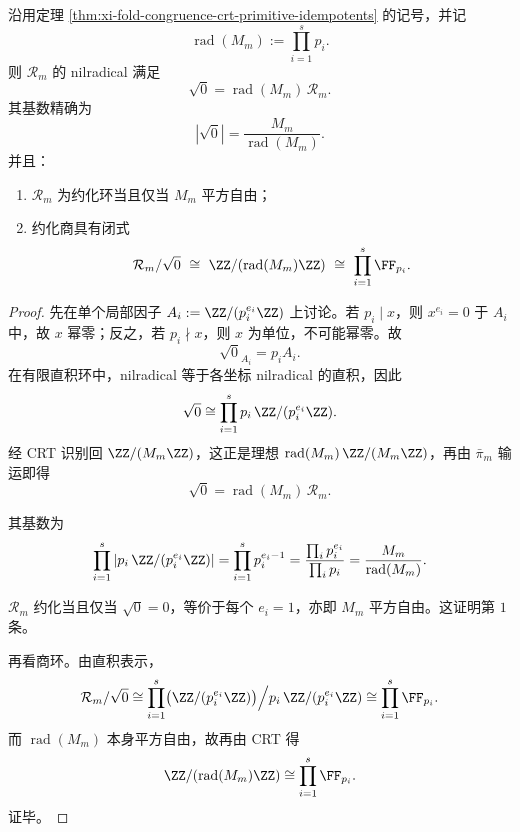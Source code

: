 \begin{theorem}\label{thm:xi-fold-congruence-nilradical-reduced-quotient}
沿用定理 \ref{thm:xi-fold-congruence-crt-primitive-idempotents} 的记号，并记
\[
\operatorname{rad}(M_m):=\prod_{i=1}^{s}p_i.
\]
则 \(\mathcal R_m\) 的 nilradical 满足
\[
\sqrt{0}=\operatorname{rad}(M_m)\,\mathcal R_m.
\]
其基数精确为
\[
|\sqrt{0}|=\frac{M_m}{\operatorname{rad}(M_m)}.
\]
并且：
\begin{enumerate}
  \item \(\mathcal R_m\) 为约化环当且仅当 \(M_m\) 平方自由；
  \item 约化商具有闭式
  \[
  \mathcal R_m/\sqrt{0}
  \ \cong\
  \ZZ/(\operatorname{rad}(M_m)\ZZ)
  \ \cong\
  \prod_{i=1}^{s}\FF_{p_i}.
  \]
\end{enumerate}
\end{theorem}
\begin{proof}
先在单个局部因子 \(A_i:=\ZZ/(p_i^{e_i}\ZZ)\) 上讨论。若 \(p_i\mid x\)，则 \(x^{e_i}=0\) 于 \(A_i\) 中，故 \(x\) 幂零；反之，若 \(p_i\nmid x\)，则 \(x\) 为单位，不可能幂零。故
\[
\sqrt{0}_{A_i}=p_iA_i.
\]
在有限直积环中，nilradical 等于各坐标 nilradical 的直积，因此
\[
\sqrt{0}\cong \prod_{i=1}^{s}p_i\,\ZZ/(p_i^{e_i}\ZZ).
\]
经 CRT 识别回 \(\ZZ/(M_m\ZZ)\)，这正是理想 \(\operatorname{rad}(M_m)\,\ZZ/(M_m\ZZ)\)，再由 \(\bar\pi_m\) 输运即得
\[
\sqrt{0}=\operatorname{rad}(M_m)\,\mathcal R_m.
\]

其基数为
\[
\prod_{i=1}^{s}|p_i\,\ZZ/(p_i^{e_i}\ZZ)|
=
\prod_{i=1}^{s}p_i^{e_i-1}
=
\frac{\prod_i p_i^{e_i}}{\prod_i p_i}
=
\frac{M_m}{\operatorname{rad}(M_m)}.
\]

\(\mathcal R_m\) 约化当且仅当 \(\sqrt{0}=0\)，等价于每个 \(e_i=1\)，亦即 \(M_m\) 平方自由。这证明第 \(1\) 条。

再看商环。由直积表示，
\[
\mathcal R_m/\sqrt{0}
\cong
\prod_{i=1}^{s}
\bigl(\ZZ/(p_i^{e_i}\ZZ)\bigr)\Big/p_i\,\ZZ/(p_i^{e_i}\ZZ)
\cong
\prod_{i=1}^{s}\FF_{p_i}.
\]
而 \(\operatorname{rad}(M_m)\) 本身平方自由，故再由 CRT 得
\[
\ZZ/(\operatorname{rad}(M_m)\ZZ)\cong \prod_{i=1}^{s}\FF_{p_i}.
\]
证毕。
\end{proof}

